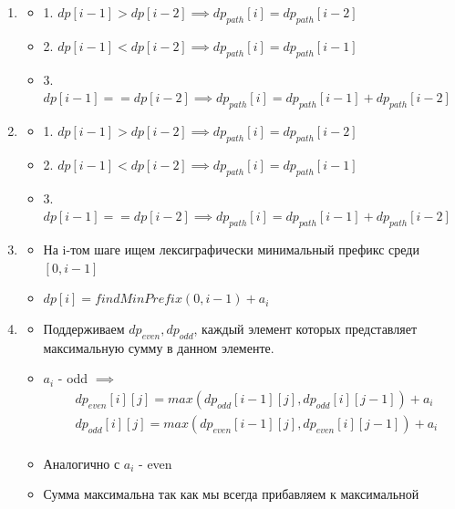 \documentclass{article}
\begin{document}
\begin{enumerate}
    \item [10.154] 
    \begin{itemize}
        \item 1. $dp[i - 1] > dp[i - 2] \implies dp_{path}[i] = dp_{path}[i-2]$
        \item 2. $dp[i - 1] < dp[i - 2] \implies dp_{path}[i] = dp_{path}[i - 1]$
        \item 3. $dp[i-1] == dp[i-2] \implies dp_{path}[i] = dp_{path}[i-1] + dp_{path}[i-2]$
    \end{itemize}

    \item [10.155] 
    \begin{itemize}
        \item 1. $dp[i - 1] > dp[i - 2] \implies dp_{path}[i] = dp_{path}[i-2]$
        \item 2. $dp[i - 1] < dp[i - 2] \implies dp_{path}[i] = dp_{path}[i - 1]$
        \item 3. $dp[i-1] == dp[i-2] \implies dp_{path}[i] = dp_{path}[i-1] + dp_{path}[i-2]$
    \end{itemize}

    \item [10.156]
    \begin{itemize}
        \item На i-том шаге ищем лексиграфически минимальный префикс среди $[0, i-1]$
        \item $dp[i] = findMinPrefix(0, i - 1) + a_i$
    \end{itemize}

    \item [10.157]
    \begin{itemize}
        \item Поддерживаем $dp_{even}, dp_{odd}$, каждый элемент которых представляет максимальную сумму в данном элементе.
        \item $a_i$ - odd $\implies$ 
        \begin{align*}
             &dp_{even}[i][j] = max(dp_{odd}[i-1][j], dp_{odd}[i][j- 1]) + a_i \\
             &dp_{odd}[i][j] = max(dp_{even}[i-1][j], dp_{even}[i][j-1]) + a_i \\ 
        \end{align*}
        \item Аналогично с $a_i$ - even
        \item Сумма максимальна так как мы всегда прибавляем к максимальной 
    \end{itemize}
    
\end{enumerate}
\end{document}
